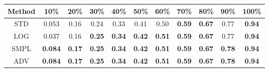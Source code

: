 \documentclass{standalone}
\begin{document}
\begin{tabular}{c|cccccccccc}
      \toprule
      Method & 10\% & 20\% & 30\% & 40\% & 50\% & 60\% & 70\% & 80\% & 90\% & 100\% \\
      \midrule
STD & 0.053 & 0.16 & 0.24 & 0.33 & 0.41 & 0.50 & \textbf{0.59} & \textbf{0.67} & 0.77 & \textbf{0.94}\\
LOG & 0.037 & 0.16 & \textbf{0.25} & \textbf{0.34} & \textbf{0.42} & \textbf{0.51} & \textbf{0.59} & \textbf{0.67} & 0.77 & \textbf{0.94}\\
SMPL & \textbf{0.084} & \textbf{0.17} & \textbf{0.25} & \textbf{0.34} & \textbf{0.42} & \textbf{0.51} & \textbf{0.59} & \textbf{0.67} & \textbf{0.78} & \textbf{0.94}\\
ADV & \textbf{0.084} & \textbf{0.17} & \textbf{0.25} & \textbf{0.34} & \textbf{0.42} & \textbf{0.51} & \textbf{0.59} & \textbf{0.67} & \textbf{0.78} & \textbf{0.94}\\
  \bottomrule
\end{tabular}
\end{document}
